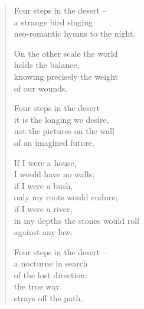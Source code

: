 \begin{verse}
Four steps in the desert --\\
a strange bird singing\\
neo-romantic hymns to the night.

On the other scale the world\\
holds the balance,\\
knowing precisely the weight\\
of our wounds.

Four steps in the desert --\\
it is the longing we desire,\\
not the pictures on the wall\\
of an imagined future.

If I were a house,\\
I would have no walls;\\
if I were a bush,\\
only my roots would endure;\\
if I were a river,\\
in my depths the stones would roll\\
against any law.

Four steps in the desert --\\
a nocturne in search\\
of the lost direction:\\
the true way\\
strays off the path.
\end{verse}
